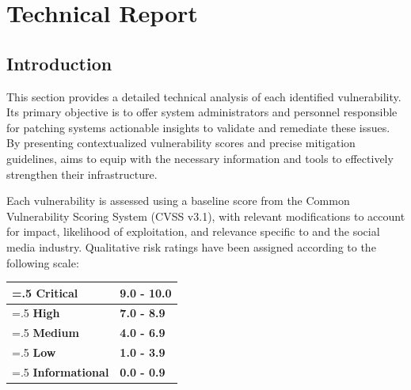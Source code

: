 \section{Technical Report}


    \subsection*{Introduction}

    This section provides a detailed technical analysis of each identified vulnerability. Its primary objective is to offer system administrators and personnel responsible for patching \client systems actionable insights to validate and remediate these issues. By presenting contextualized vulnerability scores and precise mitigation guidelines, \team aims to equip \client with the necessary information and tools to effectively strengthen their infrastructure.

    Each vulnerability is assessed using a baseline score from the Common Vulnerability Scoring System (CVSS v3.1), with relevant modifications to account for impact, likelihood of exploitation, and relevance specific to \client and the social media industry. Qualitative risk ratings have been assigned according to the following scale:

    \begin{tabularx}{\textwidth}{|>{\hsize=.5\hsize}X|>{\hsize=1.5\hsize}X|}
        \hline
        \cellcolor{criticalPurpleBackground} \leavevmode\color{white}\textbf{Critical} & \leavevmode\color{criticalPurple}\textbf{9.0 - 10.0}\\
        \hline
        \cellcolor{highRedBackground} \leavevmode\color{white}\textbf{High} & \leavevmode\color{highRed}\textbf{7.0 - 8.9}\\
        \hline
        \cellcolor{mediumOrangeBackground} \leavevmode\color{white}\textbf{Medium} & \leavevmode\color{mediumOrange}\textbf{4.0 - 6.9}\\
        \hline
        \cellcolor{lowGreenBackground} \leavevmode\color{white}\textbf{Low} & \leavevmode\color{lowGreen}\textbf{1.0 - 3.9}\\
        \hline
        \cellcolor{infoBlueBackground} \leavevmode\color{white}\textbf{Informational} & \leavevmode\color{infoBlue}\textbf{0.0 - 0.9}\\
        \hline
    \end{tabularx}

